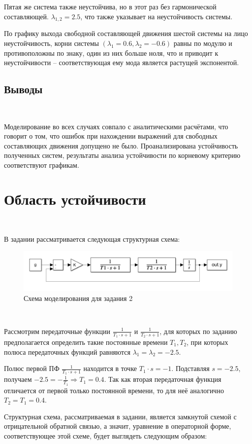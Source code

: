 \documentclass[a4paper]{article}
\begin{document}
Пятая же система также неустойчива, но в этот раз без гармонической составляющей. $\lambda_{1,2} = 2.5$, что также указывает на неустойчивость системы.\ 

По графику выхода свободной составляющей движения шестой системы на лицо неустойчивость, корни системы $(\lambda_1 = 0.6, \lambda_2 = -0.6)$ равны по модулю и противоположны по знаку, один из них больше ноля, что и приводит к неустойчивости -- соответствующая ему мода является растущей экспонентой.

\subsection{Выводы}\

Моделирование во всех случаях совпало с аналитическими расчётами, что говорит о том, что ошибок при нахождении выражений для свободных составляющих движения допущено не было. Проанализирована устойчивость полученных систем, результаты анализа устойчивости по корневому критерию соответствуют графикам.

\section{Область устойчивости}\

В задании рассматривается следующая структурная схема:

\begin{figure}[H]
    \centering
    \includegraphics[width=0.75\linewidth]{ex2/scheme.png}
    \caption{Схема моделирования для задания 2}
\end{figure}\ 

Рассмотрим передаточные функции $\frac{1}{T_1 \cdot s + 1}$ и $\frac{1}{T_2\cdot s + 1}$, для которых по заданию предполагается определить такие постоянные времени $T_1, T_2$, при которых полюса передаточных функций равняются $\lambda_1 = \lambda_2 = -2.5$.\ 

Полюс первой ПФ $\frac{1}{T_1 \cdot s + 1}$ находится в точке $T_1\cdot s = -1$. Подставляя $s = -2.5$, получаем $-2.5 = -\frac{1}{T_1} \Rightarrow T_1 = 0.4$. Так как вторая передаточная функция отличается от первой только постоянной времени, то для неё аналогично $T_2 = T_1 = 0.4$.\ 

Структурная схема, рассматриваемая в задании, является замкнутой схемой с отрицательной обратной связью, а значит, уравнение в операторной форме, соответствующее этой схеме, будет выглядеть следующим образом:
\end{document}
